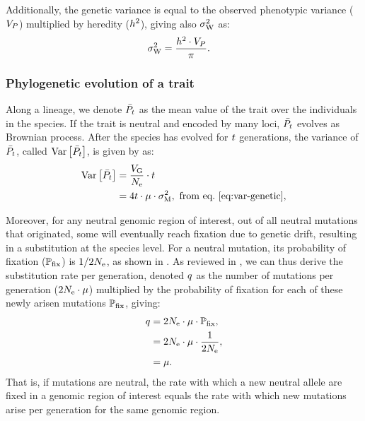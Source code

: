 \documentclass{article}
\begin{document}
Additionally, the genetic variance is equal to the observed phenotypic variance ($V_{P}$) multiplied by heredity ($h^2$), giving also $\sigma^2_{\mathrm{W}}$ as:
\begin{align}
    \sigma^2_{\mathrm{W}} & = \frac{h^2 \cdot V_{P} }{\pi }. \label{eq:rate-pheno-pop}
\end{align}

\subsubsection{Phylogenetic evolution of a trait}

Along a lineage, we denote $\bar{P_{t}}$ as the mean value of the trait over the individuals in the species.
If the trait is neutral and encoded by many loci, $\bar{P_{t}}$ evolves as Brownian process\cite{hansen_translating_1996}.
After the species has evolved for $t$ generations, the variance of $\bar{P_{t}}$, called $\operatorname{\text{Var}} \left[\bar{P_{t}}\right]$, is given by \textcite{hansen_translating_1996} as:
\begin{align}
    \operatorname{\text{Var}} \left[\bar{P_{t}}\right] & = \frac{V_{\mathrm{G}}}{N_{\text{e}}} \cdot t \\
    & = 4 t \cdot \mu \cdot \sigma^2_{\mathrm{M}} \label{eq:covar},\text{ from eq.~\ref{eq:var-genetic}},
\end{align}

Moreover, for any neutral genomic region of interest, out of all neutral mutations that originated, some will eventually reach fixation due to genetic drift, resulting in a substitution at the species level.
For a neutral mutation, its probability of fixation ($\mathbb{P}_{\text{fix}}$) is $1/2N_{\text{e}}$, as shown in \textcite{kimura_probability_1962}.
As reviewed in \textcite{mccandlish_modeling_2014}, we can thus derive the substitution rate per generation, denoted $q$ as the number of mutations per generation ($2N_{\text{e}} \cdot \mu$) multiplied by the probability of fixation for each of these newly arisen mutations $\mathbb{P}_{\text{fix}}$, giving:
\begin{align}
    q & = 2 N_{\text{e}} \cdot \mu \cdot \mathbb{P}_{\text{fix}}, \\
    & = 2 N_{\text{e}}  \cdot \mu  \cdot \dfrac{1}{2N_{\text{e}}}, \\
    & = \mu. \label{eq:substitution-rate}
\end{align}
That is, if mutations are neutral, the rate with which a new neutral allele are fixed in a genomic region of interest equals the rate with which new mutations arise per generation for the same genomic region\cite{kimura_evolutionary_1968}.
\end{document}
